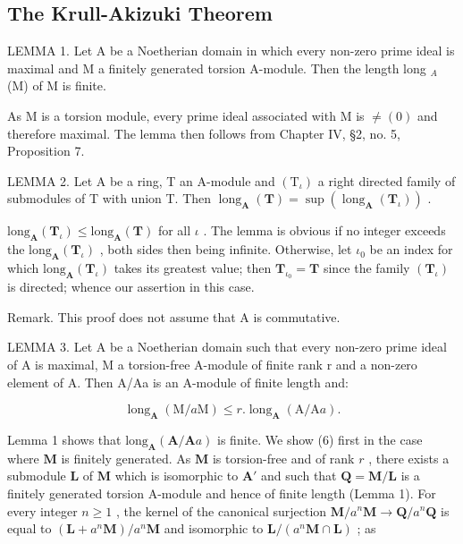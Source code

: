 \subsection{The Krull-Akizuki Theorem}

LEMMA 1. Let A be a Noetherian domain in which every non-zero prime ideal is maximal and M a finitely generated torsion A-module. Then the length long \(_{A}\) (M) of M is finite.

As M is a torsion module, every prime ideal associated with M is \(\neq(0)\) and therefore maximal. The lemma then follows from Chapter IV, §2, no. 5, Proposition 7.

LEMMA 2. Let A be a ring, T an A-module and \((\mathrm{T}_{\iota})\) a right directed family of submodules of T with union T. Then \(\operatorname{long}_{\mathbf{A}}(\mathbf{T}) = \sup (\operatorname{long}_{\mathbf{A}}(\mathbf{T}_{\iota}))\) .

\(\text{long}_{\mathbf{A}}(\mathbf{T}_{\iota}) \leqslant \text{long}_{\mathbf{A}}(\mathbf{T})\) for all \(\iota\) . The lemma is obvious if no integer exceeds the \(\text{long}_{\mathbf{A}}(\mathbf{T}_{\iota})\) , both sides then being infinite. Otherwise, let \(\iota_{0}\) be an index for which \(\text{long}_{\mathbf{A}}(\mathbf{T}_{\iota})\) takes its greatest value; then \(\mathbf{T}_{\iota_{0}} = \mathbf{T}\) since the family \((\mathbf{T}_{\iota})\) is directed; whence our assertion in this case.

Remark. This proof does not assume that A is commutative.

LEMMA 3. Let A be a Noetherian domain such that every non-zero prime ideal of A is maximal, M a torsion-free A-module of finite rank r and a non-zero element of A. Then A/Aa is an A-module of finite length and:

\[
\operatorname{long} _ {\mathbf {A}} (\mathrm{M} / a \mathrm{M}) \leqslant r. \operatorname{long} _ {\mathbf {A}} (\mathrm{A} / \mathrm{A} a).\tag{6}
\]

Lemma 1 shows that \(\mathrm{long}_{\mathbf{A}}(\mathbf{A} / \mathbf{A}a)\) is finite. We show (6) first in the case where \(\mathbf{M}\) is finitely generated. As \(\mathbf{M}\) is torsion-free and of rank \(r\) , there exists a submodule \(\mathbf{L}\) of \(\mathbf{M}\) which is isomorphic to \(\mathbf{A}'\) and such that \(\mathbf{Q} = \mathbf{M} / \mathbf{L}\) is a finitely generated torsion A-module and hence of finite length (Lemma 1). For every integer \(n \geqslant 1\) , the kernel of the canonical surjection \(\mathbf{M} / a^n\mathbf{M} \to \mathbf{Q} / a^n\mathbf{Q}\) is equal to \((\mathbf{L} + a^n\mathbf{M}) / a^n\mathbf{M}\) and isomorphic to \(\mathbf{L} / (a^n\mathbf{M} \cap \mathbf{L})\) ; as

